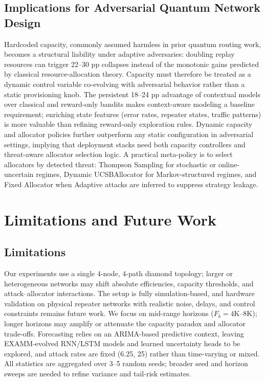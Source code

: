 \documentclass[10pt,twocolumn,journal]{IEEEtran}
\begin{document}
\subsection{Implications for Adversarial Quantum Network Design}

Hardcoded capacity, commonly assumed harmless in prior quantum routing work, becomes a structural liability under adaptive adversaries: doubling replay resources can trigger 22--30 pp collapses instead of the monotonic gains predicted by classical resource-allocation theory. Capacity must therefore be treated as a dynamic control variable co-evolving with adversarial behavior rather than a static provisioning knob. The persistent 18--24 pp advantage of contextual models over classical and reward-only bandits makes context-aware modeling a baseline requirement; enriching state features (error rates, repeater states, traffic patterns) is more valuable than refining reward-only exploration rules. Dynamic capacity and allocator policies further outperform any static configuration in adversarial settings, implying that deployment stacks need both capacity controllers and threat-aware allocator selection logic. A practical meta-policy is to select allocators by detected threat: Thompson Sampling for stochastic or online-uncertain regimes, Dynamic UCSBAllocator for Markov-structured regimes, and Fixed Allocator when Adaptive attacks are inferred to suppress strategy leakage.

\section{Limitations and Future Work}
\label{sec:limitations}

\subsection{Limitations}

Our experiments use a single 4-node, 4-path diamond topology; larger or heterogeneous networks may shift absolute efficiencies, capacity thresholds, and attack--allocator interactions. The setup is fully simulation-based, and hardware validation on physical repeater networks with realistic noise, delays, and control constraints remains future work. We focus on mid-range horizons ($F_b = 4\text{K}–8\text{K}$); longer horizons may amplify or attenuate the capacity paradox and allocator trade-offs. Forecasting relies on an ARIMA-based predictive context, leaving EXAMM-evolved RNN/LSTM models and learned uncertainty heads to be explored, and attack rates are fixed (6.25, 25) rather than time-varying or mixed. All statistics are aggregated over 3--5 random seeds; broader seed and horizon sweeps are needed to refine variance and tail-risk estimates.
\end{document}
